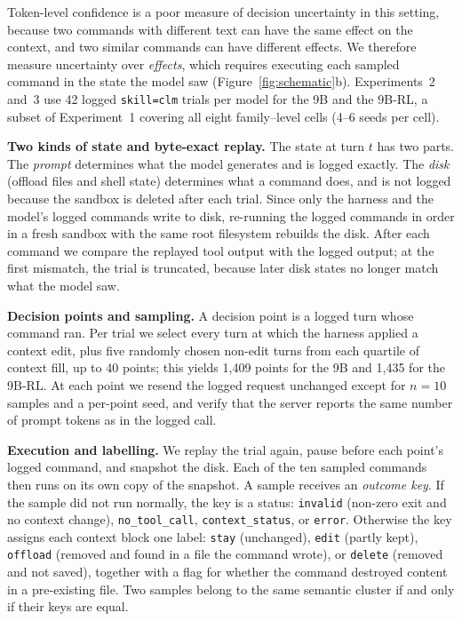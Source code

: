 \documentclass{article}
\begin{document}
Token-level confidence is a poor measure of decision uncertainty in this setting, because two commands with different text can have the same effect on the context, and two similar commands can have different effects.
We therefore measure uncertainty over \emph{effects}, which requires executing each sampled command in the state the model saw (Figure~\ref{fig:schematic}b).
Experiments~2 and~3 use 42 logged \texttt{skill=clm} trials per model for the 9B and the 9B-RL, a subset of Experiment~1 covering all eight family--level cells (4--6 seeds per cell).

\textbf{Two kinds of state and byte-exact replay.} The state at turn $t$ has two parts.
The \emph{prompt} determines what the model generates and is logged exactly.
The \emph{disk} (offload files and shell state) determines what a command does, and is not logged because the sandbox is deleted after each trial.
Since only the harness and the model's logged commands write to disk, re-running the logged commands in order in a fresh sandbox with the same root filesystem rebuilds the disk.
After each command we compare the replayed tool output with the logged output; at the first mismatch, the trial is truncated, because later disk states no longer match what the model saw.

\textbf{Decision points and sampling.} A decision point is a logged turn whose command ran.
Per trial we select every turn at which the harness applied a context edit, plus five randomly chosen non-edit turns from each quartile of context fill, up to 40 points; this yields 1{,}409 points for the 9B and 1{,}435 for the 9B-RL.
At each point we resend the logged request unchanged except for $n=10$ samples and a per-point seed, and verify that the server reports the same number of prompt tokens as in the logged call.

\textbf{Execution and labelling.} We replay the trial again, pause before each point's logged command, and snapshot the disk.
Each of the ten sampled commands then runs on its own copy of the snapshot.
A sample receives an \emph{outcome key}.
If the sample did not run normally, the key is a status: \texttt{invalid} (non-zero exit and no context change), \texttt{no\_tool\_call}, \texttt{context\_status}, or \texttt{error}.
Otherwise the key assigns each context block one label: \texttt{stay} (unchanged), \texttt{edit} (partly kept), \texttt{offload} (removed and found in a file the command wrote), or \texttt{delete} (removed and not saved), together with a flag for whether the command destroyed content in a pre-existing file.
Two samples belong to the same semantic cluster if and only if their keys are equal.
\end{document}
